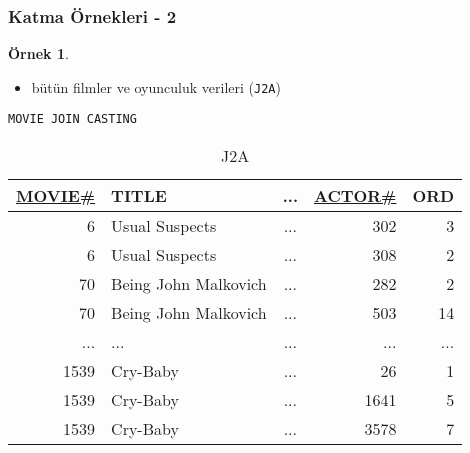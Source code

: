 \documentclass[dvipsnames]{beamer}
\theoremstyle{definition}
\theoremstyle{example}
\newtheorem{ornek}[theorem]{Örnek}
\theoremstyle{plain}
\begin{document}
\begin{frame}[fragile]
  \frametitle{Katma Örnekleri - 2}

  \begin{ornek}
    \begin{itemize}
      \item bütün filmler ve oyunculuk verileri (\texttt{J2A})
    \end{itemize}

    \begin{lstlisting}
MOVIE JOIN CASTING
    \end{lstlisting}

    \pause
    \vspace{-10pt}
    \begin{tiny}
    \begin{table}
      \caption{J2A}
      \begin{tabular}{|r|l|c|r|r|}\hline
\underline{MOVIE\#} & TITLE & ... & \underline{ACTOR\#} & ORD\\[2pt]\hline\hline
   6 & Usual Suspects       & ... &                 302 &   3\\\hline
   6 & Usual Suspects       & ... &                 308 &   2\\\hline
  70 & Being John Malkovich & ... &                 282 &   2\\\hline
  70 & Being John Malkovich & ... &                 503 &  14\\\hline
 ... & ...                  & ... &                 ... & ...\\\hline
1539 & Cry-Baby             & ... &                  26 &   1\\\hline
1539 & Cry-Baby             & ... &                1641 &   5\\\hline
1539 & Cry-Baby             & ... &                3578 &   7\\\hline
      \end{tabular}
    \end{table}
    \end{tiny}
  \end{ornek}
\end{frame}
\end{document}
